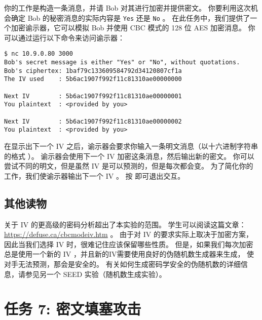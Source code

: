 你的工作是构造一条消息，并请 Bob 对其进行加密并提供密文。
你要利用这次机会确定 Bob 的秘密消息的实际内容是 \texttt{Yes} 还是 \texttt{No} 。
在此任务中，我们提供了一个加密谕示器，它可以模拟 Bob 并使用 CBC 模式的 128 位 AES 加密消息。
你可以通过运行以下命令来访问谕示器：

\begin{lstlisting}
$ nc 10.9.0.80 3000
Bob's secret message is either "Yes" or "No", without quotations.
Bob's ciphertex: 1baf79c133609584792d34120807cf1a
The IV used    : 5b6ac1907f992f11c81310ae00000000

Next IV        : 5b6ac1907f992f11c81310ae00000001
You plaintext  : <provided by you>

Next IV        : 5b6ac1907f992f11c81310ae00000002
You plaintext  : <provided by you>
\end{lstlisting}

在显示出下一个 IV 之后，谕示器会要求你输入一条明文消息（以十六进制字符串的格式
）。
谕示器会使用下一个 IV 加密这条消息，然后输出新的密文。
你可以尝试不同的明文，但是虽然 IV 是可以预测的，但是每次都会变。
为了简化你的工作，我们使谕示器输出下一个 IV 。
按  即可退出交互。




\subsection{其他读物}

关于 IV 的更高级的密码分析超出了本实验的范围。
学生可以阅读这篇文章： \url{https://defuse.ca/cbcmodeiv.htm} 。
由于对 IV 的要求实际上取决于加密方案，因此当我们选择 IV 时，很难记住应该保留哪些性质。
但是，如果我们每次加密总是使用一个新的 IV ，并且新的IV需要使用良好的伪随机数生成器来生成，
使对手无法预测，那会是安全的。
有关如何生成密码学安全的伪随机数的详细信息，请参见另一个 SEED 实验（随机数生成实验）。



\section{任务 7: 密文填塞攻击}

